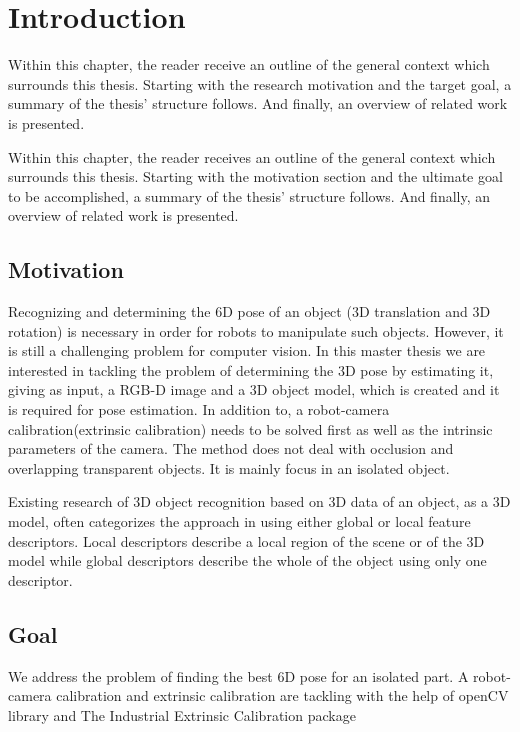 \chapter{Introduction}
Within this chapter, the reader receive an outline of the general context which surrounds this thesis. Starting with the research motivation and the target goal, a summary of the thesis' structure follows. And finally, an overview of related work is presented.  


Within this chapter, the reader receives an outline of the general context which surrounds this thesis. Starting with the motivation section and the ultimate goal to be accomplished, a summary of the thesis' structure follows. And finally, an overview of related work is presented.

\section{Motivation}

Recognizing and determining the 6D pose of an object (3D translation and 3D rotation) is necessary in order for robots to manipulate such objects. However, it is still a challenging problem for computer vision. In this master thesis we are interested in tackling the problem of determining the 3D pose by estimating it, giving as input, a RGB-D image and a 3D object model, which is created and it is required for pose estimation. In addition to, a robot-camera calibration(extrinsic calibration) needs to be solved first as well as the intrinsic parameters of the camera. The method does not deal with occlusion and overlapping transparent objects. It is mainly focus in an isolated object.


Existing research of 3D object recognition based on 3D data of an object, as a
3D model, often categorizes the approach in using either global or local feature
descriptors. Local descriptors describe a local region of the scene or of the 3D
model while global descriptors describe the whole of the object using only one
descriptor.

\section{Goal}

We address the problem of finding the best 6D pose for an isolated part. A robot-camera calibration and extrinsic calibration are tackling with the help of openCV library and The Industrial Extrinsic Calibration package \cite{intro1}  


